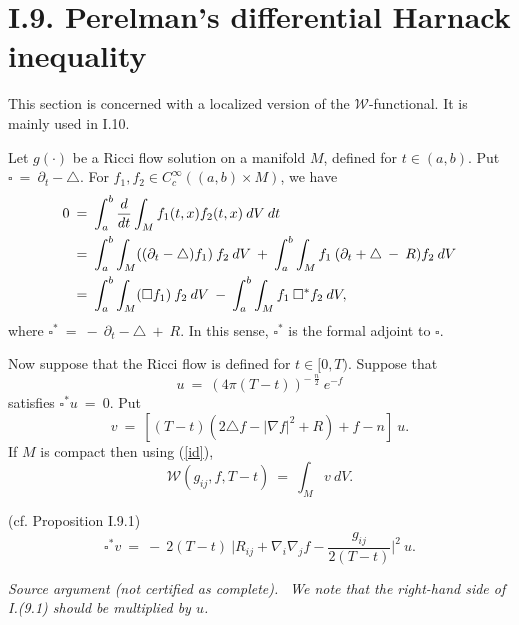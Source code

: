 \section{I.9. Perelman's differential Harnack inequality}
\label{I.9}

This section is concerned with a localized version of the ${\mathcal W}$-functional.
It is mainly used in I.10.

Let $g(\cdot)$ be a Ricci flow solution on a manifold $M$, defined for
$t \in (a,b)$. Put
$\square \: = \: \partial_t - \triangle$. For $f_1, f_2 \in C^\infty_c((a,b) \times M)$, we have
\begin{align}
0 \: & = \: \int_a^b \frac{d}{dt} \int_M f_1(t,x) f_2(t,x) \: dV \: dt \\
&  = \:
\int_a^b \int_M ((\partial_t - \triangle) f_1) \: f_2 \: dV \: + \:
\int_a^b \int_M f_1 \: (\partial_t + \triangle \: - \: R) f_2 \: dV \notag \\
&  = \:
\int_a^b \int_M (\square f_1) \: f_2 \: dV \: - \:
\int_a^b \int_M f_1 \:  \square^* f_2 \: dV, \notag
\end{align}
where $\square^* \: = \: - \: \partial_t - \triangle \: + \: R$. In this sense,
$\square^*$ is the formal adjoint to $\square$.

Now suppose that the Ricci flow is defined for $t \in [0,T)$.
Suppose that
\begin{equation}
u \: = \: (4\pi(T-t))^{- \: \frac{n}{2}} \: e^{-f}
\end{equation}
satisfies $\square^* u \: = \: 0$. Put
\begin{equation} \label{veqn}
v \: = \: [(T-t)(2\triangle f - |\nabla f|^2 + R) + f - n ] \: u.
\end{equation}
If $M$ is compact then using (\ref{id}),
\begin{equation}
{\mathcal W}(g_{ij},f,T-t) \: = \: \int_M v \: dV.
\end{equation}

\begin{proposition}
  \label{prop:kl-perelman-s-differential-harnack-inequality-harnack-inequalities-proposition}
 (cf. Proposition I.9.1) \label{localized}
\begin{equation} \label{I.(9.1)}
\square^*v \: = \: - \: 2(T-t) \: \Big| R_{ij} + \nabla_i \nabla_j f - \frac{g_{ij}}{2(T-t)}
\Big|^2 \: u.
\end{equation}
\end{proposition}
\par\medskip\noindent\textit{Source argument (not certified as complete).}\ \begingroup\itshape
We note that the right-hand side of I.(9.1) should be multiplied by $u$.

